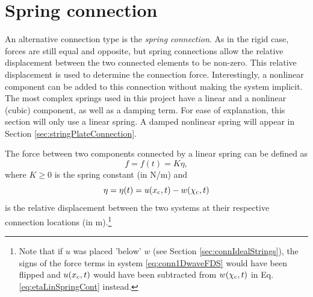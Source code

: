 

\section{Spring connection}\label{sec:springConnection}
An alternative connection type is the \textit{spring connection}. As in the rigid case, forces are still equal and opposite, but spring connections allow the relative displacement between the two connected elements to be non-zero. This relative displacement is used to determine the connection force. Interestingly, a nonlinear component can be added to this connection without making the system implicit. The most complex springs used in this project have a linear and a nonlinear (cubic) component, as well as a damping term. For ease of explanation, this section will only use a linear spring. A damped nonlinear spring will appear in Section \ref{sec:stringPlateConnection}. 

The force between two components connected by a linear spring can be defined as
\begin{equation}\label{eq:linearSpringForceCont}
    f = f(t) = K\eta,
\end{equation}
where $K\geq 0$ is the spring constant (in N/m) and
\begin{equation}\label{eq:etaLinSpringCont}
    \eta = \eta(t) = u(x_{\text{c}}, t) - w(\chi_{\text{c}}, t)
\end{equation}
is the relative displacement between the two systems at their respective connection locations (in m).\footnote{Note that if $u$ was placed 'below' $w$ (see Section \ref{sec:connIdealStrings}), the signs of the force terms in system \eqref{eq:conn1DwaveFDS} would have been flipped and $u(x_{\text{c}}, t)$ would have been subtracted from $w(\chi_{\text{c}}, t)$ in Eq. \eqref{eq:etaLinSpringCont} instead.} 


